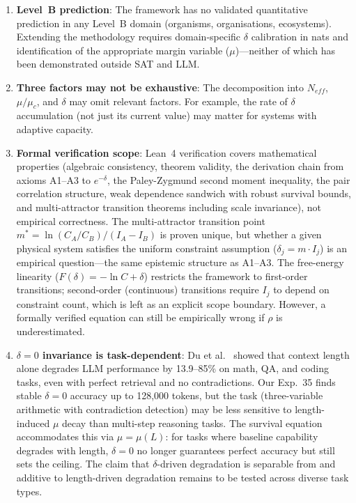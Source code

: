 \documentclass[11pt,a4paper]{article}
\begin{document}
\begin{enumerate}
    \item \textbf{Level~B prediction}: The framework has no validated quantitative prediction in any Level~B domain (organisms, organisations, ecosystems). Extending the methodology requires domain-specific $\delta$ calibration in nats and identification of the appropriate margin variable ($\mu$)---neither of which has been demonstrated outside SAT and LLM.

    \item \textbf{Three factors may not be exhaustive}: The decomposition into $N_{eff}$, $\mu/\mu_c$, and $\delta$ may omit relevant factors. For example, the rate of $\delta$ accumulation (not just its current value) may matter for systems with adaptive capacity.

    \item \textbf{Formal verification scope}: Lean~4 verification covers mathematical properties (algebraic consistency, theorem validity, the derivation chain from axioms A1--A3 to $e^{-\delta}$, the Paley-Zygmund second moment inequality, the pair correlation structure, weak dependence sandwich with robust survival bounds, and multi-attractor transition theorems including scale invariance), not empirical correctness. The multi-attractor transition point $m^* = \ln(C_A/C_B)/(I_A - I_B)$ is proven unique, but whether a given physical system satisfies the uniform constraint assumption ($\delta_j = m \cdot I_j$) is an empirical question---the same epistemic structure as A1--A3. The free-energy linearity ($F(\delta) = -\ln C + \delta$) restricts the framework to first-order transitions; second-order (continuous) transitions require $I_j$ to depend on constraint count, which is left as an explicit scope boundary. However, a formally verified equation can still be empirically wrong if $\rho$ is underestimated.

    \item \textbf{$\delta = 0$ invariance is task-dependent}: Du et al.\ \citep{du2025contextlength} showed that context length alone degrades LLM performance by 13.9--85\% on math, QA, and coding tasks, even with perfect retrieval and no contradictions. Our Exp.~35 finds stable $\delta = 0$ accuracy up to 128{,}000 tokens, but the task (three-variable arithmetic with contradiction detection) may be less sensitive to length-induced $\mu$ decay than multi-step reasoning tasks. The survival equation accommodates this via $\mu = \mu(L)$: for tasks where baseline capability degrades with length, $\delta = 0$ no longer guarantees perfect accuracy but still sets the ceiling. The claim that $\delta$-driven degradation is separable from and additive to length-driven degradation remains to be tested across diverse task types.


\end{enumerate}
\end{document}
